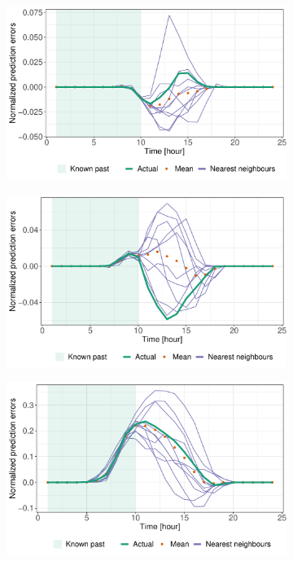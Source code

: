 \documentclass[12pt]{report}
\begin{document}
\begin{figure}[htbp] 
	\begin{subfigure}[b]{0.5\linewidth}
		\centering
		\includegraphics[width=1\linewidth]{Images/PV/KNN/NN_intraday_testdata_11.pdf} 
	\end{subfigure}%
	\begin{subfigure}[b]{0.5\linewidth}
		\centering
		\includegraphics[width=1\linewidth]{Images/PV/KNN/NN_intraday_testdata_48.pdf} 
	\end{subfigure}
	\centering
	\begin{subfigure}[b]{0.5\linewidth}
		\centering
		\includegraphics[width=1\linewidth]{Images/PV/KNN/NN_intraday_testdata_99.pdf} 

\end{subfigure}
\end{figure}
\end{document}
